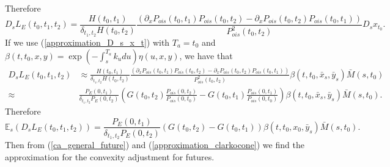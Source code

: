 \documentclass[a4paper,10pt]{article}
\newcommand{\1}{\mathbf{1}}
\begin{document}
Therefore
\begin{equation}\label{malliavin_derive_L}
D_s L_{E}(t_0,t_1,t_2) = \frac{H(t_0,t_1)}{\delta_{t_1,t_2}H(t_0,t_2)}\frac{\left(\partial_{x}P_{ois}(t_0,t_1)P_{ois}(t_0,t_2) - \partial_{x}P_{ois}(t_0,t_2) P_{ois}(t_0,t_1) \right)}{P^{2}_{ois}(t_0,t_2)} D_s x_{t_0}.
\end{equation}
If we use (\ref{approximation_D_s_x_t}) with $T_a=t_0$ and $\beta(t,t_0,x,y) = \exp\left(-\int_{s}^{T_a}k_u du \right) \eta(u,x,y)$, we have that
\begin{align*}
D_s L_{E}(t_0,t_1,t_2) &\approx \frac{H(t_0,t_1)}{\delta_{t_1,t_2}H(t_0,t_2)}\frac{\left(\partial_{x}P_{ois}(t_0,t_1)P_{ois}(t_0,t_2) - \partial_{x}P_{ois}(t_0,t_2) P_{ois}(t_0,t_1) \right)}{P^{2}_{ois}(t_0,t_2)} \beta(t,t_0,\bar{x}_s,\bar{y}_s)\bar{M}(s,t_0) \nonumber \\
\approx& \frac{P_{E}(0,t_1)}{\delta_{t_1,t_2} P_{E}(0,t_2)} \left(G(t_0,t_2) \frac{P_{ois}(0,t_2)}{P_{ois}(0,t_0)} - G(t_0,t_1) \frac{P_{ois}(0,t_1)}{P_{ois}(0,t_0)} \right)\beta(t,t_0,\bar{x}_s,\bar{y}_s)\bar{M}(s,t_0).
\end{align*}
Therefore
\begin{equation}\label{approximation_clarkocone}
\mathbb{E}_s\left( D_s L_{E}(t_0,t_1,t_2) \right) = \frac{P_{E}(0,t_1)}{\delta_{t_1,t_2} P_{E}(0,t_2)} \left(G(t_0,t_2)  - G(t_0,t_1)\right)\beta(t,t_0,x_0,\bar{y}_s)\bar{M}(s,t_0).
\end{equation}
Then from (\ref{ca_general_future}) and (\ref{approximation_clarkocone}) we find the approximation for the convexity adjustment for futures.
\end{document}
